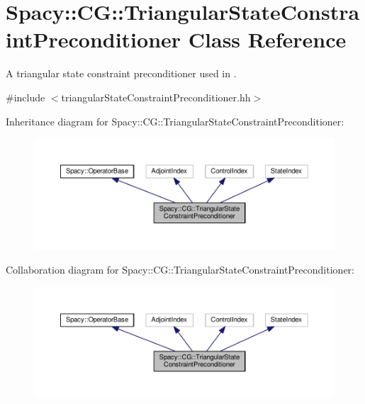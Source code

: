 \hypertarget{classSpacy_1_1CG_1_1TriangularStateConstraintPreconditioner}{\section{Spacy\-:\-:C\-G\-:\-:Triangular\-State\-Constraint\-Preconditioner Class Reference}
\label{classSpacy_1_1CG_1_1TriangularStateConstraintPreconditioner}
}


A triangular state constraint preconditioner used in \cite{Lubkoll2015a}.  




{\ttfamily \#include $<$triangular\-State\-Constraint\-Preconditioner.\-hh$>$}



Inheritance diagram for Spacy\-:\-:C\-G\-:\-:Triangular\-State\-Constraint\-Preconditioner\-:
\nopagebreak
\begin{figure}[H]
\begin{center}
\leavevmode
\includegraphics[width=350pt]{classSpacy_1_1CG_1_1TriangularStateConstraintPreconditioner__inherit__graph}
\end{center}
\end{figure}


Collaboration diagram for Spacy\-:\-:C\-G\-:\-:Triangular\-State\-Constraint\-Preconditioner\-:
\nopagebreak
\begin{figure}[H]
\begin{center}
\leavevmode
\includegraphics[width=350pt]{classSpacy_1_1CG_1_1TriangularStateConstraintPreconditioner__coll__graph}
\end{center}
\end{figure}
